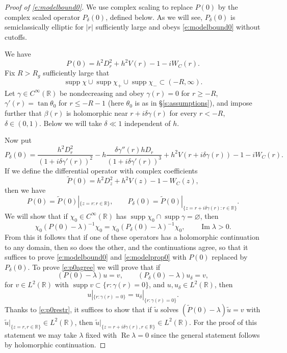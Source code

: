 \documentclass[reqno, 12pt]{amsart}
\newcommand \R {\mathbb{R}}
\DeclareMathOperator \re {Re}
\DeclareMathOperator \im {Im}
\DeclareMathOperator \supp {supp}
\theoremstyle{definition}
\numberwithin{equation}{section}
\numberwithin{prop}{section}
\numberwithin{figure}{section}
\begin{document}
\begin{proof}[Proof of \eqref{e:modelbound0}]

We use complex scaling to replace $P(0)$ by the complex scaled operator $P_\delta(0)$, defined below. As we will see, $P_\delta(0)$ is semiclassically elliptic for $|r|$ sufficiently large and obeys \eqref{e:modelbound0} without cutoffs.

We have
\[
P(0) = h^2 D_r^2 + h^2 V(r) -1 - iW_C(r).
\]
Fix $R>R_g$ sufficiently large that 
\begin{equation}\label{e:p0supp}
\supp \chi \cup \supp \chi_+ \cup \supp \chi_- \subset (-R,\infty).
\end{equation}
Let $\gamma \in C^\infty(\R)$ be nondecreasing and obey $\gamma(r) = 0$ for $r \ge -R$, $\gamma'(r) = \tan \theta_0$ for $r \le -R-1$ (here $\theta_0$ is as in \S\ref{s:assumptions}), and impose further that $\beta(r)$ is holomorphic near $r + i \delta \gamma(r)$ for every $r < -R$, $\delta \in (0,1)$. Below we will take $\delta \ll 1$ independent of $h$.


Now put
\[
P_\delta(0) = \frac{h^2 D_r^2}{(1 + i \delta \gamma'(r))^2} -  h \frac{\delta \gamma''(r)hD_r}{(1 + i \delta \gamma'(r))^3} + h^2V(r + i \delta \gamma(r)) - 1 - iW_C(r).
\]
If we define the differential operator with complex coefficients
\[
\widetilde P(0) = h^2 D_z^2 +  h^2 V(z) -1 - W_C(z),
\]
then we have
\begin{equation}\label{e:p0restr}
P(0) = \widetilde P(0)|_{\{z = r \colon r \in \R\}}, \qquad P_\delta(0) = \widetilde P(0)|_{\{z = r + i \delta \gamma(r) \colon r \in \R\}}.
\end{equation}
We will show that if $\chi_0 \in C^\infty(\R)$ has $\supp \chi_0 \cap \supp \gamma = \varnothing$, then
\begin{equation}\label{e:p0agree}
\chi_0(P(0) - \lambda)^{-1} \chi_0 = \chi_0(P_\delta(0) - \lambda)^{-1} \chi_0, \qquad \im \lambda >0.
\end{equation}
From this it follows that if one of these operators has a holomorphic continuation to any domain, then so does the other, and the continuations agree, so that it suffices to prove \eqref{e:modelbound0} and \eqref{e:modelprop0} with $P(0)$ replaced by $P_\delta(0)$. To prove  \eqref{e:p0agree} we will prove  that if
\[(P(0)-\lambda)u = v, \qquad (P_\delta(0)-\lambda)u_\delta =v,\]
for $v \in L^2(\R)$ with $\supp v \subset \{r \colon \gamma(r) = 0\}$, and $u,u_\delta\in L^2(\R)$, then
\[ u|_{\{r \colon \gamma(r) = 0\}} = u_\delta |_{\{r \colon \gamma(r) = 0\}}.\]
Thanks to \eqref{e:p0restr}, it suffices to show that if $\tilde u$ solves $(\widetilde P(0)- \lambda) \tilde u =v$ with $\tilde u|_{\{z = r, r \in \R\}} \in L^2(\R)$, then $\tilde u|_{\{z = r + i \delta \gamma(r), r \in \R\}}\in L^2(\R)$. For the proof of this statement we may take $\lambda$ fixed with $\re \lambda = 0$ since the general statement follows by holomorphic continuation.


\end{proof}
\end{document}

